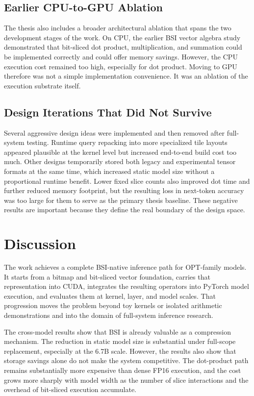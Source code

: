 \subsection{Earlier CPU-to-GPU Ablation}
The thesis also includes a broader architectural ablation that spans the two development stages of the work. On CPU, the earlier BSI vector algebra study demonstrated that bit-sliced dot product, multiplication, and summation could be implemented correctly and could offer memory savings. However, the CPU execution cost remained too high, especially for dot product. Moving to GPU therefore was not a simple implementation convenience. It was an ablation of the execution substrate itself.

\subsection{Design Iterations That Did Not Survive}
Several aggressive design ideas were implemented and then removed after full-system testing. Runtime query repacking into more specialized tile layouts appeared plausible at the kernel level but increased end-to-end build cost too much. Other designs temporarily stored both legacy and experimental tensor formats at the same time, which increased static model size without a proportional runtime benefit. Lower fixed slice counts also improved dot time and further reduced memory footprint, but the resulting loss in next-token accuracy was too large for them to serve as the primary thesis baseline. These negative results are important because they define the real boundary of the design space.

\section{Discussion}\label{sec:discussion}
The work achieves a complete BSI-native inference path for OPT-family models. It starts from a bitmap and bit-sliced vector foundation, carries that representation into CUDA, integrates the resulting operators into PyTorch model execution, and evaluates them at kernel, layer, and model scales. That progression moves the problem beyond toy kernels or isolated arithmetic demonstrations and into the domain of full-system inference research.

The cross-model results show that BSI is already valuable as a compression mechanism. The reduction in static model size is substantial under full-scope replacement, especially at the 6.7B scale. However, the results also show that storage savings alone do not make the system competitive. The dot-product path remains substantially more expensive than dense FP16 execution, and the cost grows more sharply with model width as the number of slice interactions and the overhead of bit-sliced execution accumulate.

